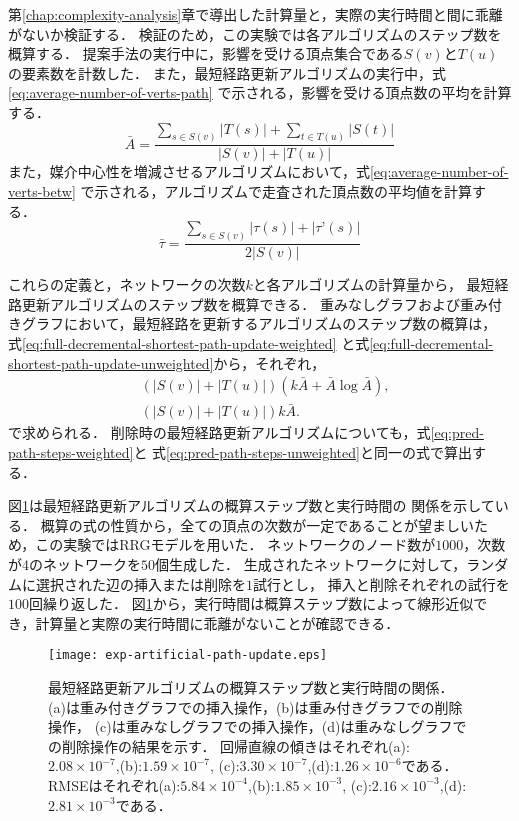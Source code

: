 第\ref{chap:complexity-analysis}章で導出した計算量と，実際の実行時間と間に乖離がないか検証する．
検証のため，この実験では各アルゴリズムのステップ数を概算する．
提案手法の実行中に，影響を受ける頂点集合である$S(v)$と$T(u)$の要素数を計数した．
また，最短経路更新アルゴリズムの実行中，式\eqref{eq:average-number-of-verts-path}
で示される，影響を受ける頂点数の平均を計算する．
\begin{equation}
  \bar{A}=\frac{\sum_{s\in S(v)}|T(s)|+\sum_{t\in T(u)}|S(t)|}{|S(v)|+|T(u)|}
  \label{eq:average-number-of-verts-path}
\end{equation}
また，媒介中心性を増減させるアルゴリズムにおいて，式\eqref{eq:average-number-of-verts-betw}
で示される，アルゴリズムで走査された頂点数の平均値を計算する．
\begin{equation}
  \bar{\tau}=\frac{\sum_{s\in S(v)}|\tau(s)|+|\tau’(s)|}{2|S(v)|}
  \label{eq:average-number-of-verts-betw}
\end{equation}

これらの定義と，ネットワークの次数$k$と各アルゴリズムの計算量から，
最短経路更新アルゴリズムのステップ数を概算できる．
重みなしグラフおよび重み付きグラフにおいて，最短経路を更新するアルゴリズムのステップ数の概算は，
式\eqref{eq:full-decremental-shortest-path-update-weighted}
と式\eqref{eq:full-decremental-shortest-path-update-unweighted}から，それぞれ，
\begin{align}
  &(|S(v)|+|T(u)|)(k\bar{A}+\bar{A}\log\bar{A}),
  \label{eq:pred-path-steps-weighted} \\
  &(|S(v)|+|T(u)|)k\bar{A}.
  \label{eq:pred-path-steps-unweighted}
\end{align}
で求められる．
削除時の最短経路更新アルゴリズムについても，式\ref{eq:pred-path-steps-weighted}と
式\ref{eq:pred-path-steps-unweighted}と同一の式で算出する．

図\ref{fig:exp-artificial-path-update}は最短経路更新アルゴリズムの概算ステップ数と実行時間の
関係を示している．
概算の式の性質から，全ての頂点の次数が一定であることが望ましいため，この実験ではRRGモデルを用いた．
ネットワークのノード数が$1000$，次数が$4$のネットワークを$50$個生成した．
生成されたネットワークに対して，ランダムに選択された辺の挿入または削除を$1$試行とし，
挿入と削除それぞれの試行を$100$回繰り返した．
図\ref{fig:exp-artificial-path-update}から，実行時間は概算ステップ数によって線形近似でき，計算量と実際の実行時間に乖離がないことが確認できる．

\begin{figure}
  \centering
  \texttt{[image: exp-artificial-path-update.eps]}
  \caption{
    最短経路更新アルゴリズムの概算ステップ数と実行時間の関係．
    (a)は重み付きグラフでの挿入操作，(b)は重み付きグラフでの削除操作，
    (c)は重みなしグラフでの挿入操作，(d)は重みなしグラフでの削除操作の結果を示す．
    回帰直線の傾きはそれぞれ(a):$2.08\times10^{-7}$,(b):$1.59\times10^{-7}$,
    (c):$3.30\times10^{-7}$,(d):$1.26\times10^{-6}$である．
    RMSEはそれぞれ(a):$5.84\times10^{-4}$,(b):$1.85\times10^{-3}$,
    (c):$2.16\times10^{-3}$,(d):$2.81\times10^{-3}$である．
  }
  \label{fig:exp-artificial-path-update}
\end{figure}

